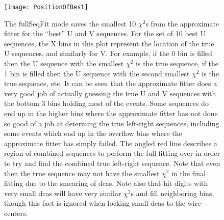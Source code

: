 			\begin{figure}[]
				\caption{The fullSeqFit mode saves the smallest 10 $\chi^{2}$s from the approximate fitter for the ``best'' U and V sequences. For the set of 10 best U sequences, the X bins in this plot represent the location of the true U sequences, and similarly for V. For example, if the 0 bin is filled then the U sequence with the smallest $\chi^{2}$ is the true sequence, if the 1 bin is filled then the U sequence with the second smallest $\chi^{2}$ is the true sequence, etc. It can be seen that the approximate fitter does a very good job of actually guessing the true U and V sequences with the bottom 3 bins holding most of the events. Some sequences do end up in the higher bins where the approximate fitter has not done so good of a job at determing the true left-right sequences, including some events which end up in the overflow bins where the approximate fitter has simply failed. The angled red line describes a region of combined sequences to perform the full fitting over in order to try and find the combined true left-right sequence. Note that even then the true sequence may not have the smallest $\chi^{2}$ in the final fitting due to the smearing of dcas. Note also that hit digits with very small dcas will have very similar $\chi^{2}$s and fill neighboring bins, though this fact is ignored when locking small dcas to the wire centers.}
				\centering
				\texttt{[image: PositionOfBest]}
				\label{fig:PositionOfBest}
			\end{figure}
